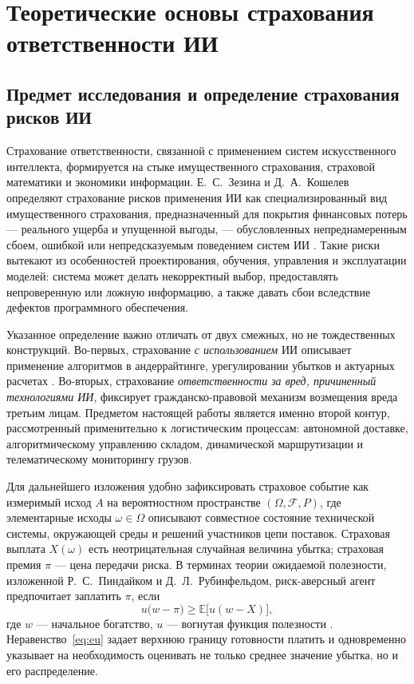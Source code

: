 \documentclass[a4paper,14pt]{extarticle}
\begin{document}
\section{Теоретические основы страхования ответственности ИИ}

\subsection{Предмет исследования и определение страхования рисков ИИ}

Страхование ответственности, связанной с применением систем искусственного интеллекта, формируется на стыке имущественного страхования, страховой математики и экономики информации. Е.~С.~Зезина и Д.~А.~Кошелев определяют страхование рисков применения ИИ как специализированный вид имущественного страхования, предназначенный для покрытия финансовых потерь --- реального ущерба и упущенной выгоды, --- обусловленных непреднамеренным сбоем, ошибкой или непредсказуемым поведением систем ИИ \cite{zezina}. Такие риски вытекают из особенностей проектирования, обучения, управления и эксплуатации моделей: система может делать некорректный выбор, предоставлять непроверенную или ложную информацию, а также давать сбои вследствие дефектов программного обеспечения.

Указанное определение важно отличать от двух смежных, но не тождественных конструкций. Во-первых, страхование \emph{с использованием} ИИ описывает применение алгоритмов в андеррайтинге, урегулировании убытков и актуарных расчетах \cite{sabitov, maglinova}. Во-вторых, страхование \emph{ответственности за вред, причиненный технологиями ИИ}, фиксирует гражданско-правовой механизм возмещения вреда третьим лицам. Предметом настоящей работы является именно второй контур, рассмотренный применительно к логистическим процессам: автономной доставке, алгоритмическому управлению складом, динамической маршрутизации и телематическому мониторингу грузов.

Для дальнейшего изложения удобно зафиксировать страховое событие как измеримый исход $A$ на вероятностном пространстве $(\Omega,\mathcal{F},P)$, где элементарные исходы $\omega\in\Omega$ описывают совместное состояние технической системы, окружающей среды и решений участников цепи поставок. Страховая выплата $X(\omega)$ есть неотрицательная случайная величина убытка; страховая премия $\pi$ --- цена передачи риска. В терминах теории ожидаемой полезности, изложенной Р.~С.~Пиндайком и Д.~Л.~Рубинфельдом, риск-аверсный агент предпочитает заплатить $\pi$, если
\begin{equation}
u\bigl(w-\pi\bigr)\ge \mathbb{E}\bigl[u(w-X)\bigr],
\label{eq:eu}
\end{equation}
где $w$ --- начальное богатство, $u$ --- вогнутая функция полезности \cite{pindyck}. Неравенство~\eqref{eq:eu} задает верхнюю границу готовности платить и одновременно указывает на необходимость оценивать не только среднее значение убытка, но и его распределение.
\end{document}
